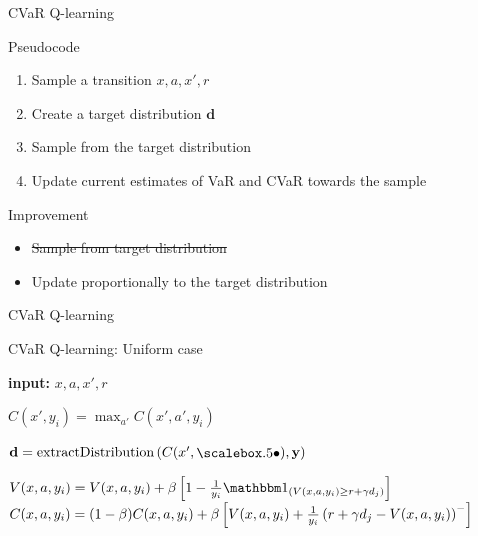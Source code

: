 \documentclass{beamer}
\begin{document}

\begin{frame}{CVaR Q-learning}

\begin{block}{Pseudocode}
\begin{enumerate}
\item Sample a transition $x, a, x', r$
\item Create a target distribution $\mathbf{d}$
\item Sample from the target distribution
\item Update current estimates of VaR and CVaR towards the sample
\end{enumerate}
\end{block}

\begin{block}{Improvement}
\begin{itemize}
\item \st{Sample from target distribution}
\item Update proportionally to the target distribution
\end{itemize}
\end{block}
\end{frame}


\begin{frame}{CVaR Q-learning}


\begin{block}{CVaR Q-learning: Uniform case}

\begin{algorithmic}[1]

    \STATE \textbf{input:} $x, a, x', r$
    
	\STATE $C(x', y_i) = \max_{a'} C(x', a', y_i)$
	\ENDFOR
	
	\STATE $\mathbf{d}= \text{extractDistribution}\bround{C(x', \bigcdot), \mathbf{y}}$

	\STATE $V(x, a, y_i) = V(x, a, y_i) + \beta \bsquare{1 - \frac{1}{y_i}\indicator_{(V(x, a, y_i) \ge r+\gamma d_j)}}$
	\STATE $C(x, a, y_i) = (1-\beta)C(x, a, y_i) + \beta\left[ {V(x, a, y_i) + \frac{1}{y_i}\left( {r+\gamma d_j - V(x, a, y_i)} \right)^-} \right]$
	\ENDFOR
\end{algorithmic}
\end{block}
\end{frame}
\end{document}
